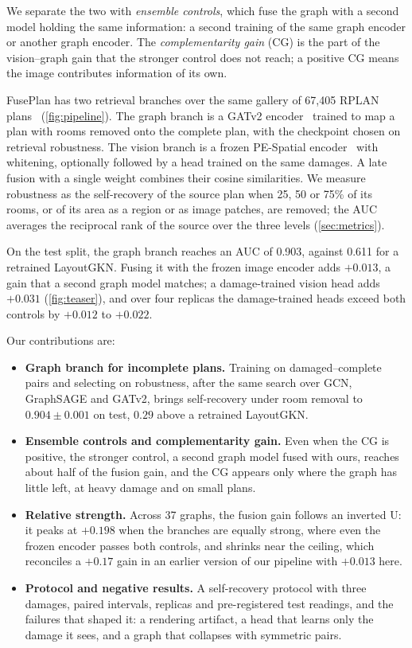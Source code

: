 We separate the two with \emph{ensemble controls}, which fuse the graph with a second model holding the same information: a second training of the same graph encoder or another graph encoder.
The \emph{complementarity gain} (CG) is the part of the vision--graph gain that the stronger control does not reach; a positive CG means the image contributes information of its own.

FusePlan has two retrieval branches over the same gallery of 67{,}405 RPLAN plans~\cite{wu2019rplan} (\cref{fig:pipeline}).
The graph branch is a GATv2 encoder~\cite{brody2022gatv2} trained to map a plan with rooms removed onto the complete plan, with the checkpoint chosen on retrieval robustness.
The vision branch is a frozen PE-Spatial encoder~\cite{bolya2025perception} with whitening, optionally followed by a head trained on the same damages.
A late fusion with a single weight combines their cosine similarities.
We measure robustness as the self-recovery of the source plan when 25, 50 or 75\% of its rooms, or of its area as a region or as image patches, are removed; the AUC averages the reciprocal rank of the source over the three levels (\cref{sec:metrics}).

On the test split, the graph branch reaches an AUC of 0.903, against 0.611 for a retrained LayoutGKN.
Fusing it with the frozen image encoder adds $+0.013$, a gain that a second graph model matches; a damage-trained vision head adds $+0.031$ (\cref{fig:teaser}), and over four replicas the damage-trained heads exceed both controls by $+0.012$ to $+0.022$.

\noindent Our contributions are:
\begin{itemize}
  \item \textbf{Graph branch for incomplete plans.} Training on damaged--complete pairs and selecting on robustness, after the same search over GCN, GraphSAGE and GATv2, brings self-recovery under room removal to $0.904\pm0.001$ on test, $0.29$ above a retrained LayoutGKN.
  \item \textbf{Ensemble controls and complementarity gain.} Even when the CG is positive, the stronger control, a second graph model fused with ours, reaches about half of the fusion gain, and the CG appears only where the graph has little left, at heavy damage and on small plans.
  \item \textbf{Relative strength.} Across 37 graphs, the fusion gain follows an inverted U: it peaks at $+0.198$ when the branches are equally strong, where even the frozen encoder passes both controls, and shrinks near the ceiling, which reconciles a $+0.17$ gain in an earlier version of our pipeline with $+0.013$ here.
  \item \textbf{Protocol and negative results.} A self-recovery protocol with three damages, paired intervals, replicas and pre-registered test readings, and the failures that shaped it: a rendering artifact, a head that learns only the damage it sees, and a graph that collapses with symmetric pairs.
\end{itemize}
